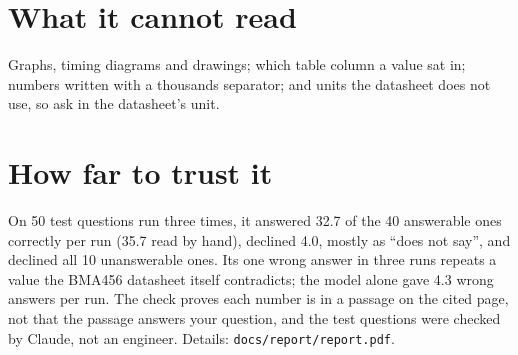 \documentclass[11pt]{article}
\begin{document}
\section*{What it cannot read}

Graphs, timing diagrams and drawings; which table column a value sat in; numbers written with a thousands separator; and units the datasheet does not use, so ask in the datasheet's unit.

\section*{How far to trust it}

On 50 test questions run three times, it answered 32.7 of the 40 answerable ones correctly per run (35.7 read by hand), declined 4.0, mostly as \enquote{does not say}, and declined all 10 unanswerable ones. Its one wrong answer in three runs repeats a value the BMA456 datasheet itself contradicts; the model alone gave 4.3 wrong answers per run. The check proves each number is in a passage on the cited page, not that the passage answers your question, and the test questions were checked by Claude, not an engineer. Details: \texttt{docs/report/report.pdf}.
\end{document}
